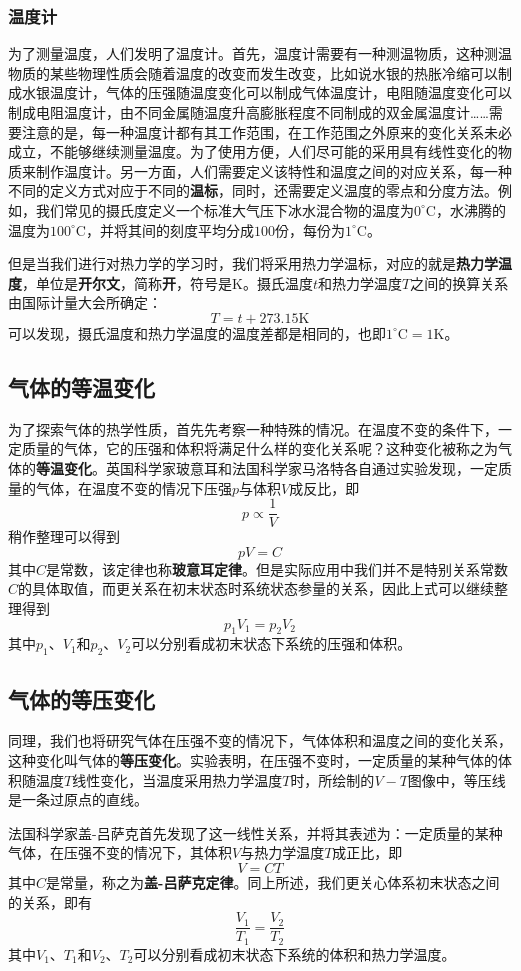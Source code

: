 \subsubsection{温度计}
为了测量温度，人们发明了温度计。首先，温度计需要有一种测温物质，这种测温物质的某些物理性质会随着温度的改变而发生改变，比如说水银的热胀冷缩可以制成水银温度计，气体的压强随温度变化可以制成气体温度计，电阻随温度变化可以制成电阻温度计，由不同金属随温度升高膨胀程度不同制成的双金属温度计……需要注意的是，每一种温度计都有其工作范围，在工作范围之外原来的变化关系未必成立，不能够继续测量温度。为了使用方便，人们尽可能的采用具有线性变化的物质来制作温度计。另一方面，人们需要定义该特性和温度之间的对应关系，每一种不同的定义方式对应于不同的\textbf{温标}，同时，还需要定义温度的零点和分度方法。例如，我们常见的摄氏度定义一个标准大气压下冰水混合物的温度为$0^\circ \mathrm{C}$，水沸腾的温度为$100^\circ \mathrm{C}$，并将其间的刻度平均分成$100$份，每份为$1^\circ \mathrm{C}$。

但是当我们进行对热力学的学习时，我们将采用热力学温标，对应的就是\textbf{热力学温度}，单位是\textbf{开尔文}，简称\textbf{开}，符号是$\mathrm{K}$。摄氏温度$t$和热力学温度$T$之间的换算关系由国际计量大会所确定：$$T=t+273.15\mathrm{K}$$可以发现，摄氏温度和热力学温度的温度差都是相同的，也即$1^\circ \mathrm{C}=1\mathrm{K}$。

\subsection{气体的等温变化}
为了探索气体的热学性质，首先先考察一种特殊的情况。在温度不变的条件下，一定质量的气体，它的压强和体积将满足什么样的变化关系呢？这种变化被称之为气体的\textbf{等温变化}。英国科学家玻意耳和法国科学家马洛特各自通过实验发现，一定质量的气体，在温度不变的情况下压强$p$与体积$V$成反比，即$$p\propto\dfrac{1}{V}$$稍作整理可以得到$$pV=C$$其中$C$是常数，该定律也称\textbf{玻意耳定律}。但是实际应用中我们并不是特别关系常数$C$的具体取值，而更关系在初末状态时系统状态参量的关系，因此上式可以继续整理得到$$p_1V_1=p_2V_2$$其中$p_1$、$V_1$和$p_2$、$V_2$可以分别看成初末状态下系统的压强和体积。
\subsection{气体的等压变化}
同理，我们也将研究气体在压强不变的情况下，气体体积和温度之间的变化关系，这种变化叫气体的\textbf{等压变化}。实验表明，在压强不变时，一定质量的某种气体的体积随温度$T$线性变化，当温度采用热力学温度$T$时，所绘制的$V-T$图像中，等压线是一条过原点的直线。

法国科学家盖-吕萨克首先发现了这一线性关系，并将其表述为：一定质量的某种气体，在压强不变的情况下，其体积$V$与热力学温度$T$成正比，即$$V=CT$$其中$C$是常量，称之为\textbf{盖-吕萨克定律}。同上所述，我们更关心体系初末状态之间的关系，即有$$\dfrac{V_1}{T_1}=\dfrac{V_2}{T_2}$$其中$V_1$、$T_1$和$V_2$、$T_2$可以分别看成初末状态下系统的体积和热力学温度。
